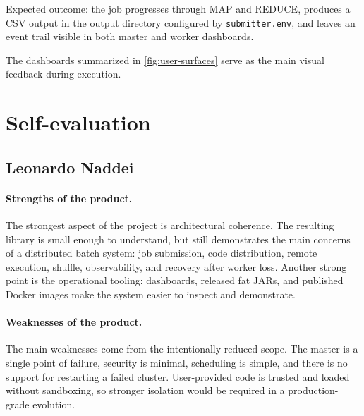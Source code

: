 \documentclass{scrartcl}
\begin{document}
Expected outcome: the job progresses through MAP and REDUCE, produces a CSV output in the output directory configured by \texttt{submitter.env}, and leaves an event trail visible in both master and worker dashboards.

The dashboards summarized in \cref{fig:user-surfaces} serve as the main visual feedback during execution.

\section{Self-evaluation}\label{self-evaluation}
\subsection*{Leonardo Naddei}

\paragraph{Strengths of the product.}
The strongest aspect of the project is architectural coherence. The resulting library is small enough to understand, but still demonstrates the main concerns of a distributed batch system: job submission, code distribution, remote execution, shuffle, observability, and recovery after worker loss. Another strong point is the operational tooling: dashboards, released fat JARs, and published Docker images make the system easier to inspect and demonstrate.

\paragraph{Weaknesses of the product.}
The main weaknesses come from the intentionally reduced scope. The master is a single point of failure, security is minimal, scheduling is simple, and there is no support for restarting a failed cluster. User-provided code is trusted and loaded without sandboxing, so stronger isolation would be required in a production-grade evolution.
\end{document}
